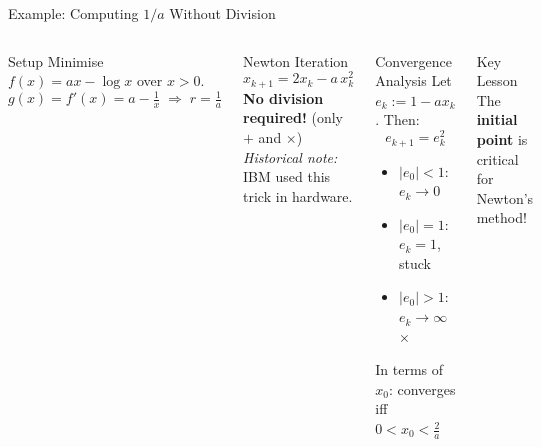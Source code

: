 \documentclass[aspectratio=169,10pt]{beamer}
\begin{document}
\begin{frame}{Example: Computing $1/a$ Without Division}
  \begin{columns}[T]
      \begin{block}{Setup}
        Minimise $f(x)=ax-\log x$ over $x>0$.
        \[
          g(x) = f'(x) = a - \tfrac{1}{x}
          \;\Rightarrow\; r = \tfrac{1}{a}
        \]
      \end{block}
      \vspace{0.3em}
      \begin{block}{Newton Iteration}
        \[
          x_{k+1} = 2x_k - a\,x_k^2
        \]
        \textbf{No division required!} (only $+$ and $\times$)\\[0.3em]
        \emph{Historical note:} IBM used this trick in hardware.
      \end{block}

      \begin{exampleblock}{Convergence Analysis}
        Let $e_k := 1 - ax_k$.  Then:
        \[
          e_{k+1} = e_k^2
        \]
        \begin{itemize}
          \item $|e_0|<1$: \;\;$e_k\to 0$ \;\checkmark
          \item $|e_0|=1$: \;\;$e_k=1$, stuck
          \item $|e_0|>1$: \;\;$e_k\to\infty$ \;\;$\times$
        \end{itemize}
        In terms of $x_0$: converges iff $0 < x_0 < \tfrac{2}{a}$
      \end{exampleblock}
      \vspace{0.2em}
      \begin{alertblock}{Key Lesson}
        The \textbf{initial point} is critical for Newton's method!
      \end{alertblock}
  \end{columns}
\end{frame}
\end{document}
